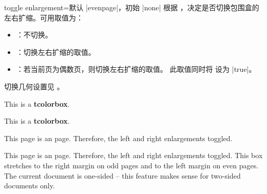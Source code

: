 \begin{docTcbKey}[][doc updated=2015-11-13]{toggle enlargement}{=}{默认 |evenpage|，初始 |none|}
  根据 ，决定是否切换包围盒的左右扩缩。可用取值为：
  \begin{itemize}
  \item{}：不切换。
  \item{}：切换左右扩缩的取值。
  \item{}：若当前页为偶数页，则切换左右扩缩的取值。
    此取值同时将  设为 |true|。
  \end{itemize}
\begin{marker}
切换几何设置见 。
\end{marker}

\begin{dispExample}

\begin{tcolorbox}[toggle enlargement=none,enhanced,show bounding box]
This is a \textbf{tcolorbox}.
\end{tcolorbox}
\begin{tcolorbox}[toggle enlargement=forced]
This is a \textbf{tcolorbox}.
\end{tcolorbox}
\begin{tcolorbox}[toggle enlargement=evenpage]
  This page is an  page.
  Therefore, the left and right enlargements
   toggled.
\end{tcolorbox}
\end{dispExample}

\begin{dispListing}
\begin{tcolorbox}[colframe=red!60!black,colback=red!15!white,
  fonttitle=\bfseries,title=Floating box from \texttt{toggle enlargement},
  width=\textwidth,grow to right by=2cm,toggle enlargement,float=t]
  This page is an  page.
  Therefore, the left and right enlargements  toggled.
  This box stretches to the right margin on odd pages and to the left
  margin on even pages. The current document is one-sided -- this feature makes
  sense for two-sided documents only.
\end{tcolorbox}
\end{dispListing}
\tcbusetemp
\end{docTcbKey}



